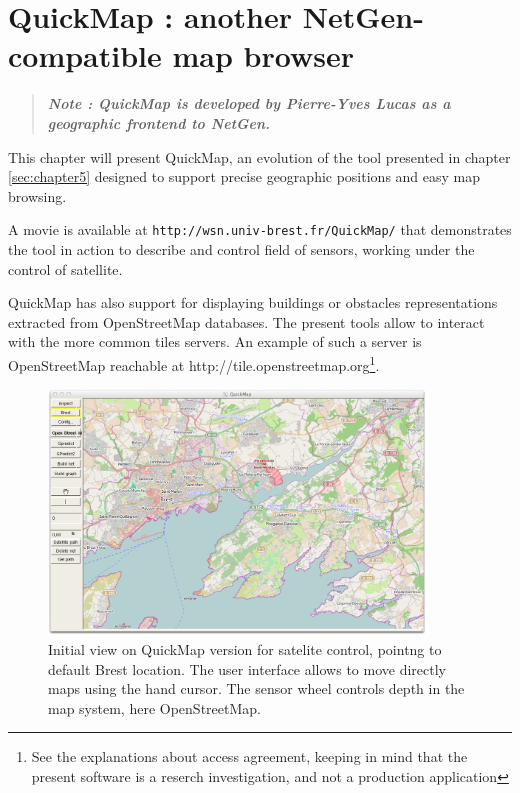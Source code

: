 
\chapter{QuickMap : another NetGen-compatible map browser}

\begin{quote}

{\sl \bf{Note :} QuickMap is developed by Pierre-Yves Lucas as a geographic frontend to NetGen.}

\end{quote}

\label{sec:chapter5bis}

This chapter will present QuickMap, an evolution of the tool presented in chapter \ref{sec:chapter5}
designed to support precise geographic positions and easy map  browsing. 


A movie is available at {\tt http://wsn.univ-brest.fr/QuickMap/} that demonstrates 
the tool in action to describe and control field of sensors,  working
under the control of satellite.

QuickMap has also support for displaying 
buildings or obstacles representations extracted from OpenStreetMap databases. 
The present tools allow to interact with the more common tiles servers. 
An example of such a server is OpenStreetMap reachable at http://tile.openstreetmap.org\footnote{See the 
explanations about access agreement, keeping in mind that the present software is 
a reserch investigation, and not a production application}.


\begin{figure}[hbtp]
\begin{center}
\includegraphics[width=10cm]{QuickMapSatBrest.png}
\caption{Initial view on QuickMap version for satelite control,
pointng to default Brest location. The user interface allows to move directly maps using
the hand cursor. The sensor wheel controls depth in the map system, here OpenStreetMap.}
\label{fig:initialQuickMapBrest}
\end{center}
\end{figure}

